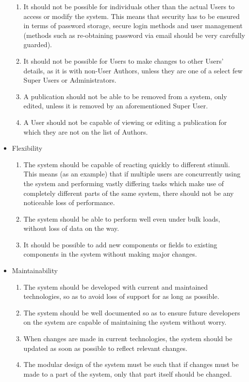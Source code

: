 \documentclass[hidelinks,a4paper,12pt]{article}
\begin{document}
\begin{itemize}
\begin{enumerate}
			\item It should not be possible for individuals other than the actual Users to access or modify the system. This means that security has to be ensured in terms of password storage, secure login methods and user management (methods such as re-obtaining password via email should be very carefully guarded).
			\item It should not be possible for Users to make changes to other Users' details, as it is with non-User Authors, unless they are one of a select few Super Users or Administrators.
			\item A publication should not be able to be removed from a system, only edited, unless it is removed by an aforementioned Super User.
			\item A User should not be capable of viewing or editing a publication for which they are not on the list of Authors.
		\end{enumerate}
		\item Flexibility
		\begin{enumerate}
			\item The system should be capable of reacting quickly to different stimuli. This means (as an example) that if multiple users are concurrently using the system and performing vastly differing tasks which make use of completely different parts of the same system, there should not be any noticeable loss of performance.
			\item The system should be able to perform well even under bulk loads, without loss of data on the way.
			\item It should be possible to add new components or fields to existing components in the system without making major changes. 
		\end{enumerate}
		\item Maintainability
		\begin{enumerate}
			\item The system should be developed with current and maintained technologies, so as to avoid loss of support for as long as possible.
			\item The system should be well documented so as to ensure future developers on the system are capable of maintaining the system without worry.
			\item When changes are made in current technologies, the system should be updated as soon as possible to reflect relevant changes.
			\item The modular design of the system must be such that if changes must be made to a part of the system, only that part itself should be changed.

\end{enumerate}
\end{itemize}
\end{document}
